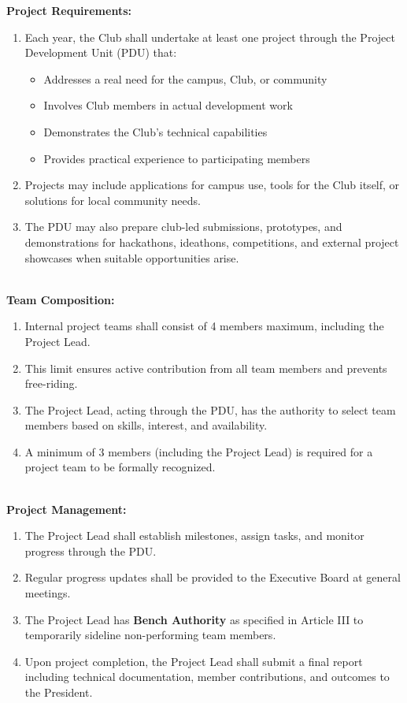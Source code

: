 
\textbf{Project Requirements:}
\begin{enumerate}[label=\alph*), leftmargin=2em, itemsep=0.3em]
    \item Each year, the Club shall undertake at least one project through the Project Development Unit (PDU) that:
    \begin{itemize}[leftmargin=1.5em, itemsep=0.2em]
        \item Addresses a real need for the campus, Club, or community
        \item Involves Club members in actual development work
        \item Demonstrates the Club's technical capabilities
        \item Provides practical experience to participating members
    \end{itemize}
    \item Projects may include applications for campus use, tools for the Club itself, or solutions for local community needs.
    \item The PDU may also prepare club-led submissions, prototypes, and demonstrations for hackathons, ideathons, competitions, and external project showcases when suitable opportunities arise.
\end{enumerate}
\\
\textbf{Team Composition:}
\begin{enumerate}[label=\alph*), leftmargin=2em, itemsep=0.3em]
    \item Internal project teams shall consist of 4 members maximum, including the Project Lead.
    \item This limit ensures active contribution from all team members and prevents free-riding.
    \item The Project Lead, acting through the PDU, has the authority to select team members based on skills, interest, and availability.
    \item A minimum of 3 members (including the Project Lead) is required for a project team to be formally recognized.
\end{enumerate}
\\
\textbf{Project Management:}
\begin{enumerate}[label=\alph*), leftmargin=2em, itemsep=0.3em]
    \item The Project Lead shall establish milestones, assign tasks, and monitor progress through the PDU.
    \item Regular progress updates shall be provided to the Executive Board at general meetings.
    \item The Project Lead has \textbf{Bench Authority} as specified in Article III to temporarily sideline non-performing team members.
    \item Upon project completion, the Project Lead shall submit a final report including technical documentation, member contributions, and outcomes to the President.
\end{enumerate}

